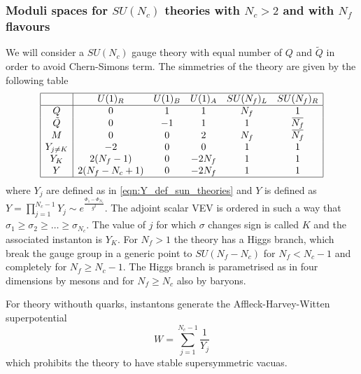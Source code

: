 \subsubsection{Moduli spaces for $SU(N_c)$ theories with $N_c >2 $ and with $N_f$ flavours }
We will consider a $SU(N_c)$ gauge theory with equal number of $Q$ and $\tilde{Q}$ in order to avoid Chern-Simons term. 
The simmetries of the theory are given by the following table
 \begin{equation}
\begin{array}{| c | c c c c c |}
\hline
  & U(1)_R & U(1)_B & U(1)_A & SU(N_f)_L & SU(N_f)_R \\
 \hline
 Q & 0 &1 & 1 & N_f & 1 \\  
 \tilde{Q}& 0 &-1 & 1 &1 & \overbar{N_f}  \\  
   M & 0 & 0 & 2 & N_f & \overbar{N_f}\\  
   Y_{j \neq K} & -2 & 0  & 0 &  1 & 1 \\
   Y_{K} & 2 (N_f -1 ) & 0 & - 2 N_f & 1 & 1 \\
   Y & 2 ( N_f -N_c +1) & 0 & - 2 N_f & 1 & 1 \\
   \hline
\end{array}
\end{equation}
where $Y_j$ are defined as in \eqref{eqn:Y_def_sun_theories} and $Y$ is defined as $Y = \prod_{j=1}^{N_c -1} Y_j \sim e^{ \frac{ \Phi_1 - \Phi_{N_c}  }{g^2}}$.
The adjoint scalar VEV is ordered in such a way that $ \sigma_1 \geq \sigma_2 \geq \dotsc \geq \sigma_{N_c}$. The value of $j$ for which $\sigma$ changes sign is called $K$ and the associated instanton is $Y_K$.
For $N_f > 1$ the theory has a Higgs branch, which break the gauge group in a generic point to $SU(N_f -N_c)$ for $N_f <N_c -1 $ and completely for $N_f \geq N_c - 1$. 
The Higgs branch is parametrised as in four dimensions by mesons and for $N_f \geq N_c$ also by baryons.

For theory withouth quarks, instantons generate the Affleck-Harvey-Witten \cite{Affleck:1982as} superpotential
\begin{equation}
W = \sum_{j=1}^{N_c - 1} \frac{1}{Y_j}
\label{eqn:def_AHW_Superpotential_Sun}
\end{equation}
which prohibits the theory to have stable supersymmetric vacuas.

